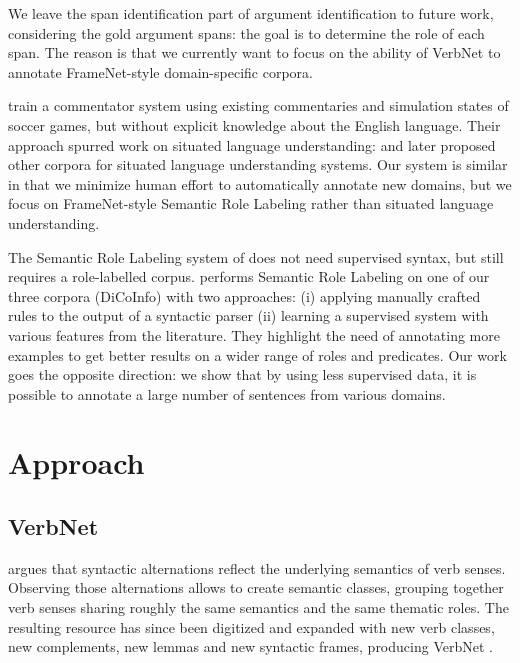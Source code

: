 We leave the span identification part of argument identification to future
work, considering the gold argument spans: the goal is to determine the role of
each span. The reason is that we currently want to focus on the ability of
VerbNet to annotate FrameNet-style domain-specific corpora.

\cite{chen2008learning} train a commentator system using
existing commentaries and simulation states of soccer games, but without
explicit knowledge about the English language. Their approach spurred work on
situated language understanding: \cite{bordes2010towards}
and \cite{richardson2012towards} later proposed other
corpora for situated language understanding systems. Our system is similar in
that we minimize human effort to automatically annotate new domains, but we
focus on FrameNet-style Semantic Role Labeling rather than situated language
understanding.

The Semantic Role Labeling system of \cite{gormley2014low} does not need
supervised syntax, but still requires a role-labelled corpus.
\cite{hadouche2011annotation} performs Semantic Role Labeling on one of our
three corpora (DiCoInfo) with two approaches: (i) applying manually crafted
rules to the output of a syntactic parser (ii) learning a supervised system
with various features from the literature. They highlight the need of
annotating more examples to get better results on a wider range of roles and
predicates. Our work goes the opposite direction: we show that by using less
supervised data, it is possible to annotate a large number of sentences from
various domains.

\section{Approach}

\subsection{VerbNet}
\label{subsec:verbnet}

\cite{levin1993english} argues that syntactic alternations reflect the
underlying semantics of verb senses. Observing those alternations allows to
create semantic classes, grouping together verb senses sharing roughly the same
semantics and the same thematic roles. The resulting resource has since been
digitized and expanded with new verb classes, new complements, new lemmas and
new syntactic frames, producing VerbNet \cite{kipperschuler2005verbnet}.

